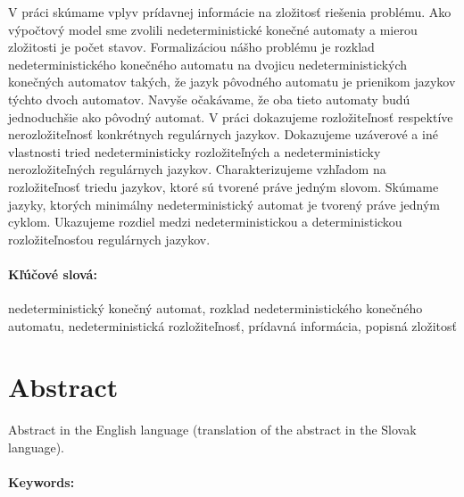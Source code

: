 \documentclass[12pt, oneside]{book}
\begin{document}
V práci skúmame vplyv prídavnej informácie na zložitosť riešenia problému. Ako výpočtový model sme zvolili nedeterministické konečné automaty a mierou zložitosti je počet stavov. Formalizáciou nášho problému je rozklad nedeterministického konečného automatu na dvojicu nedeterministických konečných automatov takých, že jazyk pôvodného automatu je prienikom jazykov týchto dvoch automatov. Navyše očakávame, že oba tieto automaty budú jednoduchšie ako pôvodný automat. V práci dokazujeme rozložiteľnosť respektíve nerozložiteľnosť konkrétnych regulárnych jazykov. Dokazujeme uzáverové a iné vlastnosti tried nedeterministicky rozložiteľných a nedeterministicky nerozložiteľných regulárnych jazykov. Charakterizujeme vzhľadom na rozložiteľnosť triedu jazykov, ktoré sú tvorené práve jedným slovom. Skúmame jazyky, ktorých minimálny nedeterministický automat je tvorený práve jedným cyklom. Ukazujeme rozdiel medzi nedeterministickou a deterministickou rozložiteľnosťou regulárnych jazykov.

\paragraph*{Kľúčové slová:} nedeterministický konečný automat, rozklad nedeterministického konečného automatu, nedeterministická rozložiteľnosť, prídavná informácia, popisná zložitosť


\newpage 
\section*{Abstract}

Abstract in the English language (translation of the abstract in the
Slovak language).


\paragraph*{Keywords:} 


%
%
\end{document}
